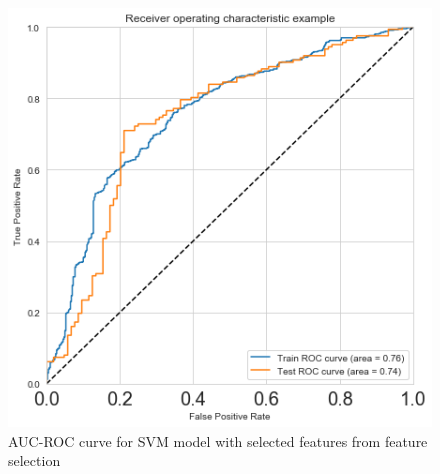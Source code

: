 \documentclass[format=sigconf]{acmart}
\begin{document}
\begin{figure}[H]
    \centering
    \includegraphics[scale=0.50]{images/AUC_ROC_SVM_Model_3.png}
    \caption{AUC-ROC curve for SVM model with selected features from feature selection}
    \label{fig:aucrocmodel3}
\end{figure}
\end{document}

